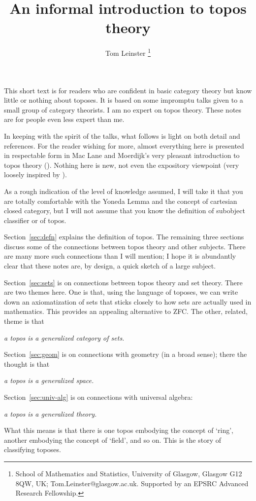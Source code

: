 \documentclass{article}
\title{An informal introduction to topos theory}
\author{Tom Leinster%
\thanks{School of Mathematics and Statistics, University of Glasgow, Glasgow
G12 8QW, UK;
Tom.Leinster@glasgow.ac.uk.  Supported by an EPSRC Advanced Research
Fellowship.}}
\date{}
\newcommand{\slogan}[1]{\begin{center}\it #1\end{center}}
\begin{document}
\maketitle

\vspace*{10mm}
\tableofcontents
\vspace*{12mm}

\noindent
This short text is for readers who are confident in basic category theory but
know little or nothing about toposes.  It is based on some impromptu talks
given to a small group of category theorists.  I am no expert on topos theory.
These notes are for people even less expert than me.

In keeping with the spirit of the talks, what follows is light on both detail
and references.  For the reader wishing for more, almost everything
here is presented in respectable form in Mac Lane and Moerdijk's very pleasant
introduction to topos theory (\citeyear{MaMo}).  Nothing here is new, not even
the expository viewpoint (very loosely inspired by \citet{JohSE}).

As a rough indication of the level of knowledge assumed, I will take it that
you are totally comfortable with the Yoneda Lemma and the concept of
cartesian closed category, but I will not assume that you know the definition
of subobject classifier or of topos.

Section~\ref{sec:defn} explains the definition of topos.  The remaining three
sections discuss some of the connections between topos theory and other
subjects.  There are many more such connections than I will mention; I hope it
is abundantly clear that these notes are, by design, a quick sketch of a
large subject.

Section~\ref{sec:sets} is on connections between topos theory and set theory.
There are two themes here.  One is that, using the language of toposes, we can
write down an axiomatization of sets that sticks closely to how sets are
actually used in mathematics.  This provides an appealing alternative to ZFC.
The other, related, theme is that 
% 
\slogan{a topos is a generalized category of sets.}

Section~\ref{sec:geom} is on connections with geometry (in a broad sense);
there the thought is that
% 
\slogan{a topos is a generalized space.}

Section~\ref{sec:univ-alg} is on connections with universal algebra:
% 
\slogan{a topos is a generalized theory.}
% 
What this means is that there is one topos embodying the concept of `ring',
another embodying the concept of `field', and so on.  This is the story of
classifying toposes.
\end{document}
